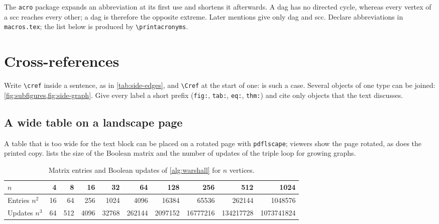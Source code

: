 The \texttt{acro} package expands an abbreviation at its first use and shortens
it afterwards. A \ac{dag} has no directed cycle, whereas every vertex of a
\ac{scc} reaches every other; a \ac{dag} is therefore the opposite extreme. Later
mentions give only \ac{dag} and \ac{scc}. Declare abbreviations in
\texttt{macros.tex}; the list below is produced by \verb|\printacronyms|.

\printacronyms[heading=none]

\section{Cross-references}

Write \verb|\cref| inside a sentence, as in \cref{tab:side-edges}, and
\verb|\Cref| at the start of one:  is such a case. Several
objects of one type can be joined: \cref{fig:subfigures,fig:side-graph}. Give every label a short prefix
(\texttt{fig:}, \texttt{tab:}, \texttt{eq:}, \texttt{thm:}) and cite only objects
that the text discusses.

\clearpage
\begin{landscape}
\section{A wide table on a landscape page}

A table that is too wide for the text block can be placed on a rotated page with
\texttt{pdflscape}; viewers show the page rotated, as does the printed copy.
 lists the size of the Boolean matrix and the number of
updates of the triple loop for growing graphs.

\begin{table}[htbp]
  \centering
  \caption{Matrix entries and Boolean updates of \cref{alg:warshall} for $n$ vertices.}
  \label{tab:landscape}
  \small
  \begin{tabular}{@{}l *{9}{r}@{}}
    \toprule
    $n$ & \num{4} & \num{8} & \num{16} & \num{32} & \num{64} & \num{128} & \num{256} & \num{512} & \num{1024} \\
    \midrule
    Entries $n^2$ & \num{16} & \num{64} & \num{256} & \num{1024} & \num{4096} & \num{16384} & \num{65536} & \num{262144} & \num{1048576} \\
    Updates $n^3$ & \num{64} & \num{512} & \num{4096} & \num{32768} & \num{262144} & \num{2097152} & \num{16777216} & \num{134217728} & \num{1073741824} \\
    \bottomrule
  \end{tabular}
\end{table}

\end{landscape}
